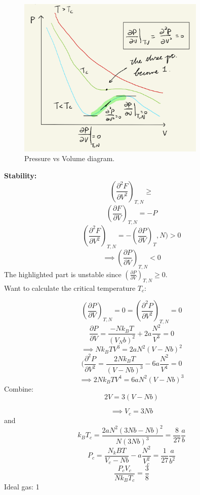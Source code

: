 \documentclass[11pt]{article}
\theoremstyle{definition}
\begin{document}
\begin{figure}[h]
	\centering
	\includegraphics[width=0.8\textwidth]{images/0702-03.png}
	\caption{Pressure vs Volume diagram.}
	\label{fig:PvsV}
\end{figure}
\textbf{Stability:} 
\[ \left (\frac{\partial ^2F}{\partial V^2} \right )_{T,N} \geq \] 
\[ \left (\frac{\partial F}{\partial V} \right )_{T,N} = -P \] 
\[ \left (\frac{\partial ^2F}{\partial V^2} \right )_{T,N} = - \left (\frac{\partial P}{\partial V} \right )_T,N) > 0 \] 
\[ \implies  \left (\frac{\partial P}{\partial V} \right )_{T,N} < 0\] 
The highlighted part is unstable since $ \left (\frac{\partial P}{\partial V} \right )_{T,N} \geq 0 $.  \\

Want to calculate the critical temperature $ T_c $:

\[ \left (\frac{\partial P}{\partial V} \right )_{T,N} = 0 = \left (\frac{\partial ^2P}{\partial V^2} \right )_{T,N} = 0 \] 
\[ \frac{\partial P}{\partial V} = \frac{-Nk_BT}{(V_Nb)^2} + 2a \frac{N^2}{V^3} = 0\] 
\[ \implies Nk_BTV^3 = 2aN^2 (V-Nb)^2 \] 
\[  (\frac{\partial ^2P}{\partial V^2}   = \frac{2Nk_BT}{(V-Nb)^3} - 6a \frac{N^2}{V^{4}} = 0\] 
\[ \implies 2Nk_BTV^4 = 6aN^2(V-Nb)^3 \] 
Combine:
\[ 2V = 3(V-Nb) \] 
\begin{shaded*}
	\[ \implies V_c = 3Nb \] 
and
\[ k_BT_c = \frac{2aN^2(3Nb-Nb)^2}{N(3Nb)^3} =  \frac{8}{27}\frac{a}{b}\] 
\[ P_c = \frac{N_kBT}{V_c-Nb} - a \frac{N^2}{V_c^2} = \frac{1}{27}\frac{a}{b^2} \] 
\[ \frac{P_cV_c}{Nk_BT_c} = \frac{3}{8} \] Ideal gas: 1
\end{shaded*}
\end{document}
